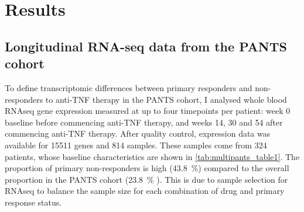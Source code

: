 

\section{Results}

\subsection{Longitudinal RNA-seq data from the PANTS cohort}

To define transcriptomic differences between primary responders and non-responders to anti-\gls{TNF} therapy in the \gls{PANTS} cohort, 
I analysed whole blood \gls{RNAseq} gene expression measured at up to four timepoints per patient:
week 0 baseline before commencing anti-\gls{TNF} therapy, and weeks 14, 30 and 54 after commencing anti-\gls{TNF} therapy.
After quality control, expression data was available for \num{15511} genes and 814 samples.
These samples come from 324 patients, whose baseline characteristics are shown in \cref{tab:multipants_table1}.
The proportion of primary non-responders is high (\SI[round-precision=1]{43.8}{\percent}) compared to the overall proportion in the \gls{PANTS} cohort (\SI[round-precision=1]{23.8}{\percent} \autocite{kennedy2019PredictorsAntiTNFTreatment}).
This is due to sample selection for \gls{RNAseq} to balance the sample size for each combination of drug and primary response status.

